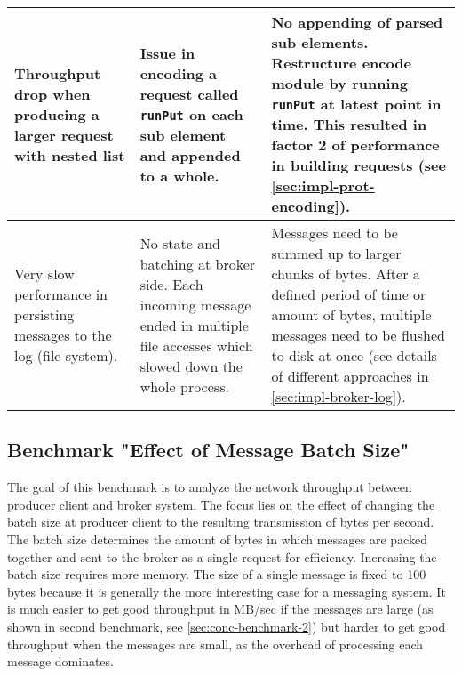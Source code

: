 \begin{table}[H]
\begin{tabular}{|p{4cm}|p{4.5cm}|p{5cm}|}
Throughput drop when producing a larger request with nested list
& Issue in encoding a request called \lstinline{runPut} on each sub element and
appended to a whole.
& No appending of parsed sub elements. Restructure encode module by running
\lstinline{runPut} at latest point in time. This resulted in factor 2 of performance in building requests (see \ref{sec:impl-prot-encoding}).                                                                                                                                      \\ \hline
Very slow performance in persisting messages to the log (file system).                                 & No state and batching at broker side. Each incoming message ended in multiple file accesses which slowed down the whole process.                                                                                                                                & Messages need to be summed up to larger chunks of bytes. After a defined period of time or amount of bytes, multiple messages need to be flushed to disk at once (see details of different approaches in \ref{sec:impl-broker-log}).                                                                                                                                      \\ \hline
\end{tabular}
\end{table}

\newpage
\subsection{Benchmark "Effect of Message Batch Size"}
\label{sec:conc-benchmark-1}

The goal of this benchmark is to analyze the network throughput between producer
client and broker system.  The focus lies on the effect of changing the batch
size at producer client to the resulting transmission of bytes per second. The
batch size determines the amount of bytes in which messages are packed
together and sent to the broker as a single request for efficiency. Increasing the
batch size requires more memory. The size of a single message is fixed to 100
bytes because it is generally the more interesting case for a messaging system. It is much easier to get good throughput in MB/sec if the messages are
large (as shown in second benchmark, see \ref{sec:conc-benchmark-2}) but
harder to get good throughput when the messages are small, as the overhead of
processing each message dominates.

